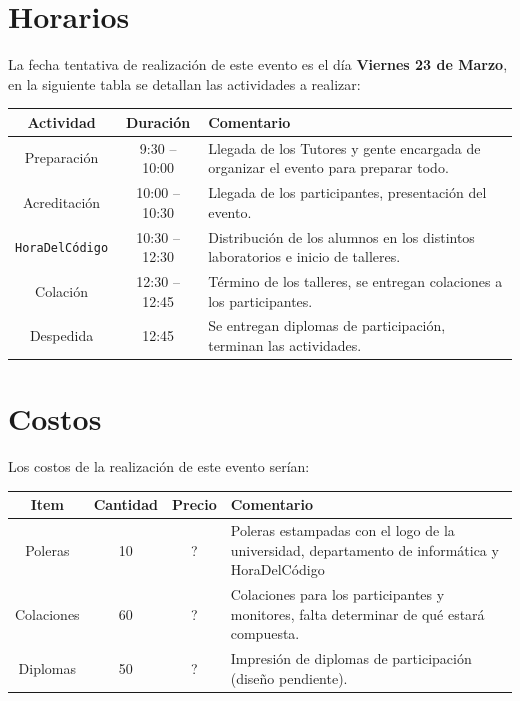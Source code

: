 \documentclass[letterpaper,12pt]{article}
\begin{document}
\section{Horarios}

La fecha tentativa de realización de este evento es el día \textbf{Viernes 23 de Marzo}, en la siguiente tabla se detallan las actividades a realizar:

\begin{center}
\begin{tabular}{|c|c| p{11cm} |}
\hline
Actividad & Duración & Comentario \\
\hline \hline
Preparación & 9:30 -- 10:00 & Llegada de los Tutores y gente encargada de organizar el evento para preparar todo. \\ \hline
Acreditación & 10:00 -- 10:30 & Llegada de los participantes, presentación del evento. \\ \hline
\texttt{HoraDelCódigo} & 10:30 -- 12:30 & Distribución de los alumnos en los distintos laboratorios e inicio de talleres. \\ \hline
Colación & 12:30 -- 12:45 & Término de los talleres, se entregan colaciones a los participantes. \\ \hline
Despedida & 12:45 & Se entregan diplomas de participación, terminan las actividades. \\ \hline
\end{tabular}
\end{center}

\section{Costos}

Los costos de la realización de este evento serían:

\begin{center}
\begin{tabular}{|c|c|c| p{11cm} |}
\hline
Item & Cantidad & Precio & Comentario \\
\hline \hline
Poleras & 10 & ? & Poleras estampadas con el logo de la universidad, departamento de informática y HoraDelCódigo\\ \hline
Colaciones & 60 & ? & Colaciones para los participantes y monitores, falta determinar de qué estará compuesta. \\ \hline
Diplomas & 50 & ? & Impresión de diplomas de participación (diseño pendiente). \\ \hline
\end{tabular}
\end{center}
\end{document}
